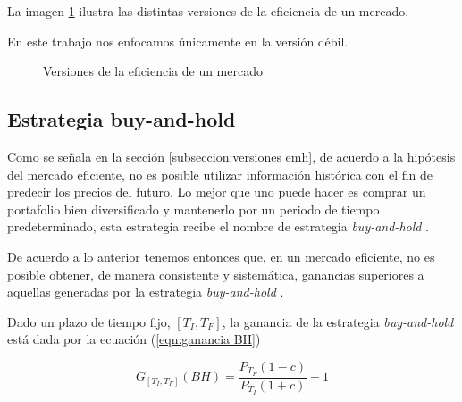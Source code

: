 \documentclass[12pt]{scrbook}
\theoremstyle{break}
\theoremstyle{break}
\newcommand{\buyhold}{\textit{buy-and-hold} }
\begin{document}
La imagen \ref{imagen:versiones emh} ilustra las distintas versiones de la eficiencia de un mercado.

En este trabajo nos enfocamos únicamente en la versión débil.

\begin{figure}[ht]
\centering
{}
\caption{\label{imagen:versiones emh} Versiones de la eficiencia de un mercado}
\end{figure}


\subsection{Estrategia buy-and-hold}
\label{seccion:buy and hold}
Como se señala en la sección \ref{subseccion:versiones emh}, de acuerdo a la hipótesis del mercado eficiente, no es posible utilizar información histórica con el fin de predecir los precios del futuro. Lo mejor que uno puede hacer es comprar un portafolio bien diversificado y mantenerlo por un periodo de tiempo predeterminado, esta estrategia recibe el nombre de estrategia \buyhold.

De acuerdo a lo anterior tenemos entonces que, en un mercado eficiente, no es posible obtener, de manera consistente y sistemática, ganancias superiores a aquellas generadas por la estrategia \buyhold.

Dado un plazo de tiempo fijo, $\left[T_{I}, T_{F}\right]$, la ganancia de la estrategia \buyhold está dada por la ecuación (\ref{eqn:ganancia BH})

\begin{equation} \label{eqn:ganancia BH}
G_{\left[T_{I}, T_{F}\right]} (BH) = \dfrac{P_{T_F} (1 - c) } { P_{T_I} (1 + c) } - 1
\end{equation}
\end{document}

